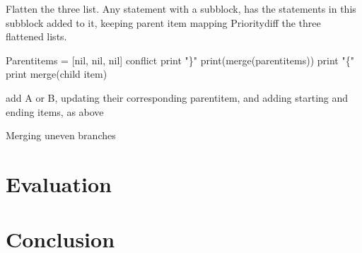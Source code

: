 \documentclass[11pt]{article}
\begin{document}
\begin{algorithm}
\begin{algorithmic}
    \State Flatten the three list. Any statement with a subblock, has the statements in this subblock added to it, keeping parent item mapping
    \State Prioritydiff the three flattened lists.

    \State Parentitems = [nil, nil, nil]
                \State \Return conflict
			\EndIf
                    \State print "\}"
                \EndIf
                    \State print(merge(parentitems))
                    	\State print "\{"
                    \EndIf
                \EndIf
			\EndIf
            \State print merge(child item)

                \State add A or B, updating their corresponding parentitem,
                \State and adding starting and ending items, as above
        \EndIf
   \EndFor

\EndFunction
\end{algorithmic}
\caption{Merging uneven branches}
\label{MergeUneven}
\end{algorithm}


\clearpage
\section{Evaluation}

\clearpage
\section{Conclusion}

\clearpage



\end{document}
